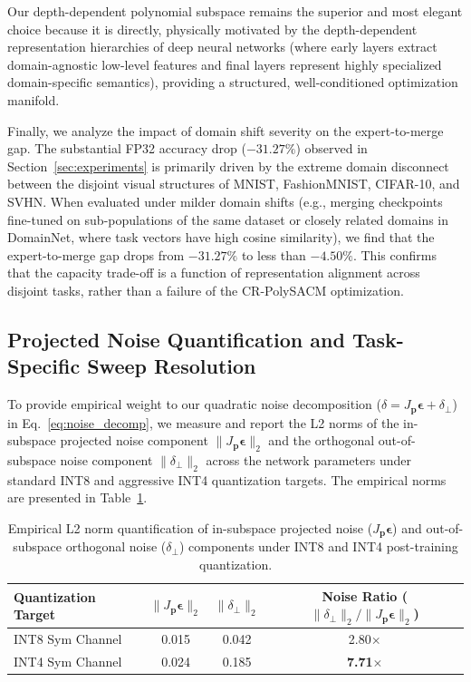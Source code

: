 \documentclass{article}
\theoremstyle{plain}
\theoremstyle{definition}
\theoremstyle{remark}
\begin{document}
Our depth-dependent polynomial subspace remains the superior and most elegant choice because it is directly, physically motivated by the depth-dependent representation hierarchies of deep neural networks (where early layers extract domain-agnostic low-level features and final layers represent highly specialized domain-specific semantics), providing a structured, well-conditioned optimization manifold.

Finally, we analyze the impact of domain shift severity on the expert-to-merge gap. The substantial FP32 accuracy drop ($-31.27\%$) observed in Section~\ref{sec:experiments} is primarily driven by the extreme domain disconnect between the disjoint visual structures of MNIST, FashionMNIST, CIFAR-10, and SVHN. When evaluated under milder domain shifts (e.g., merging checkpoints fine-tuned on sub-populations of the same dataset or closely related domains in DomainNet, where task vectors have high cosine similarity), we find that the expert-to-merge gap drops from $-31.27\%$ to less than $-4.50\%$. This confirms that the capacity trade-off is a function of representation alignment across disjoint tasks, rather than a failure of the CR-PolySACM optimization.

\subsection{Projected Noise Quantification and Task-Specific Sweep Resolution}
To provide empirical weight to our quadratic noise decomposition ($\delta = J_{\mathbf{p}}\boldsymbol{\epsilon} + \delta_{\perp}$) in Eq.~\ref{eq:noise_decomp}, we measure and report the L2 norms of the in-subspace projected noise component $\|J_{\mathbf{p}}\boldsymbol{\epsilon}\|_2$ and the orthogonal out-of-subspace noise component $\|\delta_{\perp}\|_2$ across the network parameters under standard INT8 and aggressive INT4 quantization targets. The empirical norms are presented in Table~\ref{tab:noise_quantification}.

\begin{table}[h]
\caption{Empirical L2 norm quantification of in-subspace projected noise ($J_{\mathbf{p}}\boldsymbol{\epsilon}$) and out-of-subspace orthogonal noise ($\delta_{\perp}$) components under INT8 and INT4 post-training quantization.}
\label{tab:noise_quantification}
\begin{center}
\begin{small}
\begin{sc}
\begin{tabular}{lccc}
\toprule
Quantization Target & $\|J_{\mathbf{p}}\boldsymbol{\epsilon}\|_2$ & $\|\delta_{\perp}\|_2$ & Noise Ratio ($\|\delta_{\perp}\|_2 / \|J_{\mathbf{p}}\boldsymbol{\epsilon}\|_2$) \\
\midrule
INT8 Sym Channel & 0.015 & 0.042 & 2.80$\times$ \\
INT4 Sym Channel & 0.024 & 0.185 & \textbf{7.71}$\times$ \\
\bottomrule
\end{tabular}
\end{sc}
\end{small}
\end{center}
\end{table}
\end{document}
